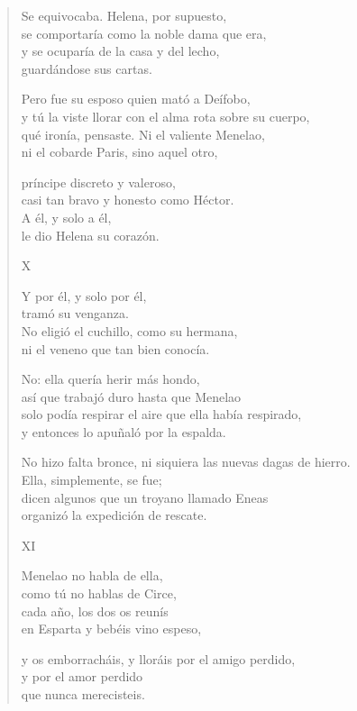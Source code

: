 \documentclass[11pt,a4paper]{article}
\begin{document}
\begin{verse}
Se equivocaba. Helena, por supuesto,\\
se comportaría como la noble dama que era,\\
y se ocuparía de la casa y del lecho,\\
guardándose sus cartas.

Pero fue su esposo quien mató a Deífobo,\\
y tú la viste llorar con el alma rota sobre su cuerpo,\\
qué ironía, pensaste. Ni el valiente Menelao,\\
ni el cobarde Paris, sino aquel otro,

príncipe discreto y valeroso,\\
casi tan bravo y honesto como Héctor.\\
A él, y solo a él,\\
le dio Helena su corazón.

X

Y por él, y solo por él,\\
tramó su venganza.\\
No eligió el cuchillo, como su hermana,\\
ni el veneno que tan bien conocía.

No: ella quería herir más hondo,\\
así que trabajó duro hasta que Menelao\\
solo podía respirar el aire que ella había respirado,\\
y entonces lo apuñaló por la espalda.

No hizo falta bronce, ni siquiera las nuevas dagas de hierro.\\
Ella, simplemente, se fue;\\
dicen algunos que un troyano llamado Eneas\\
organizó la expedición de rescate.

XI

Menelao no habla de ella,\\
como tú no hablas de Circe,\\
cada año, los dos os reunís\\
en Esparta y bebéis vino espeso,

y os emborracháis, y lloráis por el amigo perdido,\\
y por el amor perdido\\
que nunca merecisteis.
\end{verse}
\end{document}
